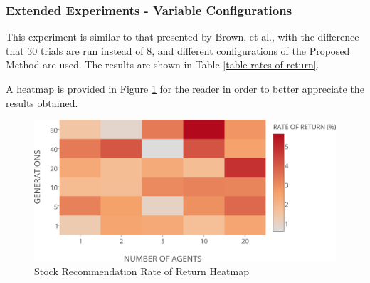 \documentclass[12pt,journal,draftcls,onecolumn]{IEEEtran}
\begin{document}
\subsubsection{Extended Experiments - Variable Configurations}

This experiment is similar to that presented by Brown, et al., with the difference that 30 trials are run instead of 8, and different configurations of the Proposed Method are used. The results are shown in Table \ref{table-rates-of-return}.

\begin{table}
  \centering
\caption{Proposed Method choosing what Stock to buy - Variable Configurations}
\label{table-rates-of-return}
\end{table}

A heatmap is provided in Figure \ref{rates-of-return-heatmap} for the
reader in order to better appreciate the results obtained.

\begin{figure}[htp]
\caption{Stock Recommendation Rate of Return Heatmap}
\label{rates-of-return-heatmap}
\begin{center}
\includegraphics[width=0.5\columnwidth]{figures/rates-of-return-heatmap/rates-of-return-heatmap.png}
\end{center}
\end{figure}
\end{document}
